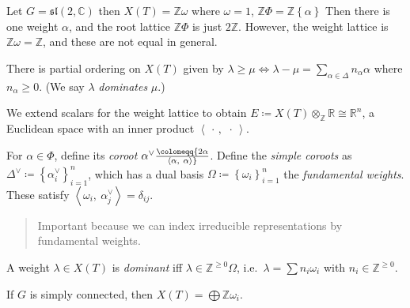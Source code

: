 \begin{example}

Let \(G = {\mathfrak{sl}}(2, {\mathbb{C}})\) then
\(X(T) = {\mathbb{Z}}\omega\) where \(\omega = 1\),
\({\mathbb{Z}}\Phi = {\mathbb{Z}}\left\{{\alpha}\right\}\) Then there is
one weight \(\alpha\), and the root lattice \({\mathbb{Z}}\Phi\) is just
\(2{\mathbb{Z}}\). However, the weight lattice is
\({\mathbb{Z}}\omega = {\mathbb{Z}}\), and these are not equal in
general.

\end{example}

\begin{remark}

There is partial ordering on \(X(T)\) given by
\(\lambda \geq \mu \iff \lambda - \mu = \sum_{\alpha\in \Delta} n_\alpha \alpha\)
where \(n_\alpha \geq 0\). (We say \(\lambda\) \emph{dominates}
\(\mu\).)

\end{remark}

\begin{definition}

We extend scalars for the weight lattice to obtain
\(E \coloneqq X(T) \otimes_{\mathbb{Z}}{\mathbb{R}}\cong {\mathbb{R}}^n\),
a Euclidean space with an inner product
\({\left\langle {{\,\cdot\,}},~{{\,\cdot\,}} \right\rangle}\).

For \(\alpha\in \Phi\), define its \emph{coroot}
\(\alpha^\vee\coloneqq{2\alpha \over {\left\langle {\alpha},~{\alpha} \right\rangle}}\).
Define the \emph{simple coroots} as
\(\Delta^\vee\coloneqq\left\{{\alpha_i^\vee}\right\}_{i=1}^n\), which
has a dual basis \(\Omega \coloneqq\left\{{\omega_i}\right\}_{i=1}^n\)
the \emph{fundamental weights}. These satisfy
\({\left\langle {\omega_i},~{\alpha_j^\vee} \right\rangle} = \delta_{ij}\).


\begin{quote}
Important because we can index irreducible representations by
fundamental weights.
\end{quote}

A weight \(\lambda\in X(T)\) is \emph{dominant} iff
\(\lambda \in {\mathbb{Z}}^{\geq 0} \Omega\),
i.e.~\(\lambda = \sum n_i \omega_i\) with
\(n_i \in {\mathbb{Z}}^{\geq 0}\).

\end{definition}

If \(G\) is simply connected, then
\(X(T) = \bigoplus {\mathbb{Z}}\omega_i\).

